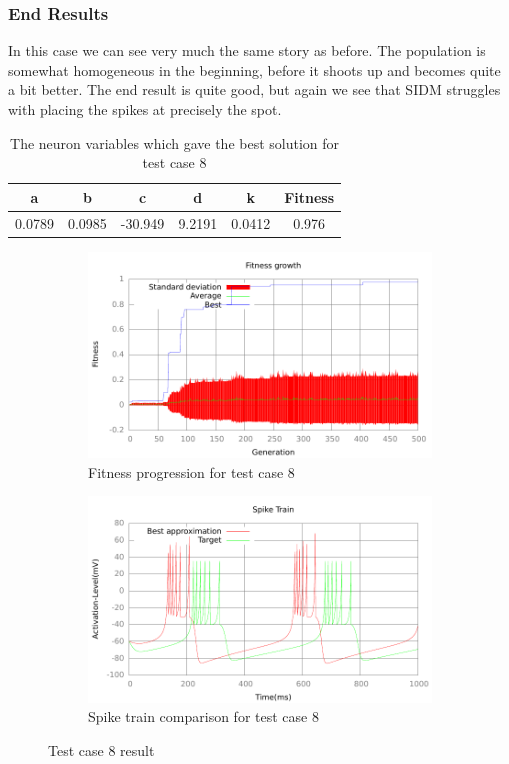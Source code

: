 \subsubsection{End Results}\label{sec:test-case-8-results}
In this case we can see very much the same story as before. The population is
somewhat homogeneous in the beginning, before it shoots up and becomes quite a bit
better. The end result is quite good, but again we see that SIDM struggles with
placing the spikes at precisely the spot.
\begin{table}
	\begin{tabular}{c c c c c c}
		a & b & c & d & k & Fitness \\
		\hline
		0.0789 & 0.0985 & -30.949 & 9.2191 & 0.0412 & 0.976
	\end{tabular}
	\caption{The neuron variables which gave the best solution for test case
	8}
\end{table}
\begin{figure}[h]
	\centering
	\begin{subfigure}[b]{0.5\textwidth}
		\includegraphics[width=\textwidth]{../output/sidm_izzy_3_fitness.pdf}
		\caption{Fitness progression for test case 8}
		\label{fig:fitness-test-case-8}
	\end{subfigure}%
	\begin{subfigure}[b]{0.5\textwidth}
		\includegraphics[width=\textwidth]{../output/sidm_izzy_3_spike.pdf}
		\caption{Spike train comparison for test case 8}
		\label{fig:spike-test-case-8}
	\end{subfigure}
	\caption{Test case 8 result}
\end{figure}


